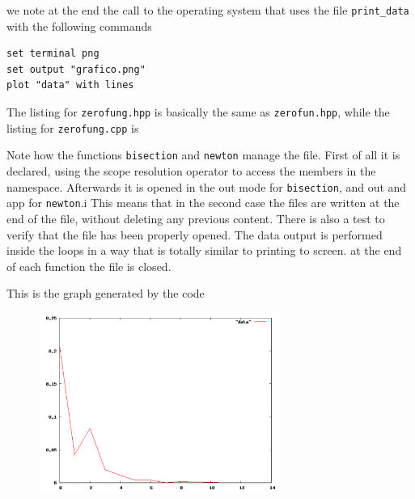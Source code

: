 we note at the end the call to the operating system that uses the file
\texttt{print\_data} with the following commands
\begin{verbatim}
set terminal png
set output "grafico.png"
plot "data" with lines
\end{verbatim}
The listing for \texttt{zerofung.hpp} is basically the same as
\texttt{zerofun.hpp}, while the listing for \texttt{zerofung.cpp} is
\lstset{basicstyle=\scriptsize\sf}
    
\lstset{basicstyle=\sf}

Note how the functions \texttt{bisection} and \texttt{newton} manage the file.
First of all it is declared, using the scope resolution operator \cpp{::} to
access the members in the  namespace. Afterwards it is opened in the
out mode for \texttt{bisection}, and out and app for \texttt{newton}.i This
means that in the second case the files are written at the end of the file,
without deleting any previous content. There is also a test to verify that the
file has been properly opened. The data output is performed inside the loops in
a way that is totally similar to printing to screen. at the end of each function
the file is closed.

This is the graph generated by the code
\begin{figure}[!h]
    \centering
    \includegraphics[width=0.7\textwidth]{./images/grafico}
\end{figure}
